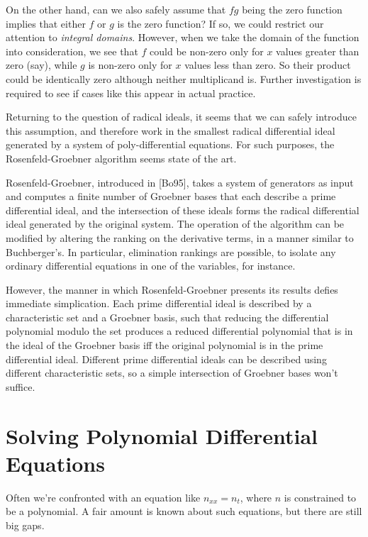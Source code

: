 \documentclass{article}
\begin{document}
On the other hand, can we also safely assume that $fg$ being the zero
function implies that either $f$ or $g$ is the zero function?  If so,
we could restrict our attention to {\it integral domains}.  However,
when we take the domain of the function into consideration, we see
that $f$ could be non-zero only for $x$ values greater than zero
(say), while $g$ is non-zero only for $x$ values less than zero.  So
their product could be identically zero although neither multiplicand
is.  Further investigation is required to see if cases like this
appear in actual practice.

Returning to the question of radical ideals, it seems that we can
safely introduce this assumption, and therefore work in the smallest
radical differential ideal generated by a system of poly-differential
equations.  For such purposes, the Rosenfeld-Groebner algorithm seems
state of the art.

Rosenfeld-Groebner, introduced in [Bo95], takes a system of generators
as input and computes a finite number of Groebner bases that each
describe a prime differential ideal, and the intersection of these
ideals forms the radical differential ideal generated by the original
system.  The operation of the algorithm can be modified by altering
the ranking on the derivative terms, in a manner similar to
Buchberger's.  In particular, elimination rankings are possible, to
isolate any ordinary differential equations in one of the variables,
for instance.

However, the manner in which Rosenfeld-Groebner presents its results
defies immediate simplication.  Each prime differential ideal is
described by a characteristic set and a Groebner basis, such that
reducing the differential polynomial modulo the set produces a reduced
differential polynomial that is in the ideal of the Groebner basis iff
the original polynomial is in the prime differential ideal.  Different
prime differential ideals can be described using different
characteristic sets, so a simple intersection of Groebner bases won't
suffice.



\vfill\eject
\section*{Solving Polynomial Differential Equations}

Often we're confronted with an equation like $n_{xx} = n_t$, where $n$
is constrained to be a polynomial.  A fair amount is known about
such equations, but there are still big gaps.
\end{document}
